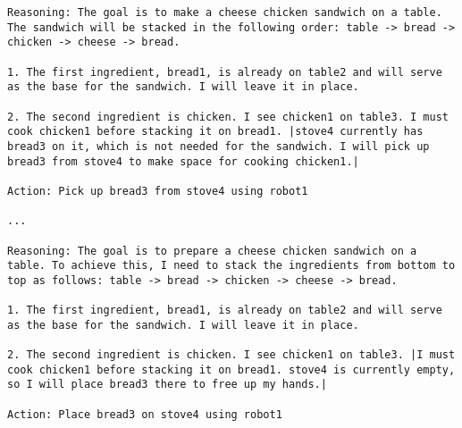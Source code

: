 \begin{lstlisting}
Reasoning: The goal is to make a cheese chicken sandwich on a table. The sandwich will be stacked in the following order: table -> bread -> chicken -> cheese -> bread.

1. The first ingredient, bread1, is already on table2 and will serve as the base for the sandwich. I will leave it in place.

2. The second ingredient is chicken. I see chicken1 on table3. I must cook chicken1 before stacking it on bread1. |stove4 currently has bread3 on it, which is not needed for the sandwich. I will pick up bread3 from stove4 to make space for cooking chicken1.|

Action: Pick up bread3 from stove4 using robot1

...

Reasoning: The goal is to prepare a cheese chicken sandwich on a table. To achieve this, I need to stack the ingredients from bottom to top as follows: table -> bread -> chicken -> cheese -> bread.

1. The first ingredient, bread1, is already on table2 and will serve as the base for the sandwich. I will leave it in place.

2. The second ingredient is chicken. I see chicken1 on table3. |I must cook chicken1 before stacking it on bread1. stove4 is currently empty, so I will place bread3 there to free up my hands.|

Action: Place bread3 on stove4 using robot1
\end{lstlisting}